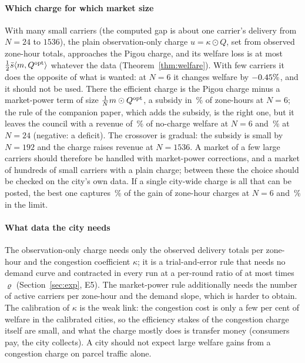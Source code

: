\documentclass[preprint,11pt,authoryear]{elsarticle}
\theoremstyle{plain}
\theoremstyle{remark}
\begin{document}
\paragraph{Which charge for which market size} With many small carriers (the computed gap is about one carrier's delivery from $N=24$ to $1536$), the plain observation-only charge $u=\kappa\odot Q$, set from observed zone-hour totals, approaches the Pigou charge, and its welfare loss is at most $\tfrac12\bar s\langle m,Q^{\mathrm{opt}}\rangle$ whatever the data (Theorem~\ref{thm:welfare}). With few carriers it does the opposite of what is wanted: at $N=6$ it changes welfare by $-0.45\%$, and it should not be used. There the efficient charge is the Pigou charge minus a market-power term of size $\tfrac1N m\odot Q^{\mathrm{opt}}$, a subsidy in \PmNegShare\,\% of zone-hours at $N=6$; the rule of the companion paper, which adds the subsidy, is the right one, but it leaves the council with a revenue of \WSixPmR\,\% of no-charge welfare at $N=6$ and \WTwentyFourPmR\,\% at $N=24$ (negative: a deficit). The crossover is gradual: the subsidy is small by $N=192$ and the charge raises revenue at $N=1536$. A market of a few large carriers should therefore be handled with market-power corrections, and a market of hundreds of small carriers with a plain charge; between these the choice should be checked on the city's own data. If a single city-wide charge is all that can be posted, the best one captures \UnSixFrac\,\% of the gain of zone-hour charges at $N=6$ and \UnWFrac\,\% in the limit.

\paragraph{What data the city needs} The observation-only charge needs only the observed delivery totals per zone-hour and the congestion coefficient $\kappa$; it is a trial-and-error rule that needs no demand curve and contracted in every run at a per-round ratio of at most \PathRatioMax{} times $\varrho$ (Section~\ref{sec:exp}, E5). The market-power rule additionally needs the number of active carriers per zone-hour and the demand slope, which is harder to obtain. The calibration of $\kappa$ is the weak link: the congestion cost is only a few per cent of welfare in the calibrated cities, so the efficiency stakes of the congestion charge itself are small, and what the charge mostly does is transfer money (consumers pay, the city collects). A city should not expect large welfare gains from a congestion charge on parcel traffic alone.
\end{document}
